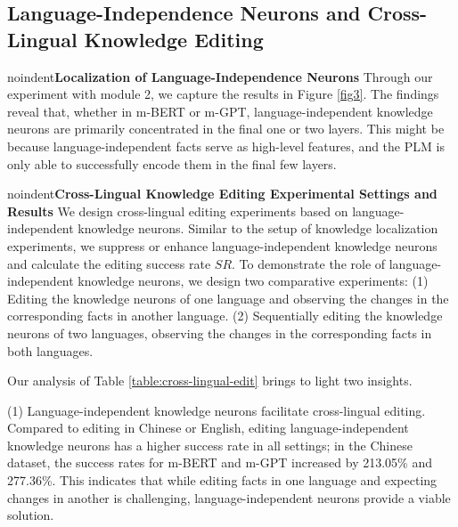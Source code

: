 \documentclass[]{article}
\newcommand{\vpara}[1]{noindent\textbf{#1 }}%
\begin{document}
\subsection{Language-Independence Neurons and Cross-Lingual Knowledge Editing}
\vpara{Localization of Language-Independence Neurons}
Through our experiment with module 2, we capture the results in Figure \ref{fig3}. The findings reveal that, whether in m-BERT or m-GPT, language-independent knowledge neurons are primarily concentrated in the final one or two layers.
This might be because language-independent facts serve as high-level features, and the PLM is only able to successfully encode them in the final few layers.

\vpara{Cross-Lingual Knowledge Editing Experimental Settings and Results}
We design cross-lingual editing experiments based on language-independent knowledge neurons. Similar to the setup of knowledge localization experiments, we suppress or enhance language-independent knowledge neurons and calculate the editing success rate \( SR \). To demonstrate the role of language-independent knowledge neurons, we design two comparative experiments:
(1) Editing the knowledge neurons of one language and observing the changes in the corresponding facts in another language.
(2) Sequentially editing the knowledge neurons of two languages, observing the changes in the corresponding facts in both languages.

Our analysis of Table \ref{table:cross-lingual-edit} brings to light two insights.

(1) Language-independent knowledge neurons facilitate cross-lingual editing. Compared to editing in Chinese or English, editing language-independent knowledge neurons has a higher success rate in all settings; in the Chinese dataset, the success rates for m-BERT and m-GPT increased by 213.05\% and 277.36\%. This indicates that while editing facts in one language and expecting changes in another is challenging, language-independent neurons provide a viable solution.
\end{document}
